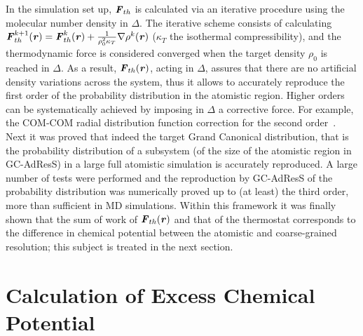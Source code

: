 \documentclass[a4paper,preprint,unsortedaddress]{revtex4-1}
\newcommand{\recheck}[1]{{\color{red} #1}}
\newcommand{\vect}[1]{\textbf{\textit{#1}}}
\begin{document}
In the simulation set up, ${\vect F}_{th}$ is calculated via an iterative procedure \recheck{using} the molecular number density in $\Delta$. The iterative scheme consists of calculating \recheck{${\vect F}^{k+1}_{th}({\vect r}) = {\vect F}^{k}_{th}({\vect r}) + \frac{1}{\rho^2_{0}\kappa_{T}}\nabla \rho^{k}({\vect r})$} ($\kappa_{T}$ the isothermal compressibility), and the thermodynamic force is considered converged when the target density $\rho_{0}$ is reached in $\Delta$. As a result, ${\vect F}_{th}({\vect r})$, acting in $\Delta$, assures that there are no artificial density variations across the system, thus it allows to accurately reproduce the first order of the probability distribution in the atomistic region. Higher orders can be systematically achieved by imposing in $\Delta$ a corrective force.
\recheck{For example, the COM-COM radial distribution function correction for the second order~\cite{jctchan}.} Next it was proved that indeed the target Grand Canonical distribution, that is the probability distribution of a subsystem (of the size of the atomistic region in GC-AdResS) in a large full atomistic simulation is accurately reproduced. A large number of tests were performed and the reproduction by GC-AdResS of the probability distribution was numerically proved up to (at least) the third order, more than sufficient in MD simulations. Within this framework it was finally shown that the sum of work of ${\vect F}_{th}({\vect r})$ and that of the thermostat corresponds to the difference in chemical potential between the atomistic and coarse-grained resolution; this subject is treated in the next section.


\section{Calculation of Excess Chemical Potential}
\end{document}
